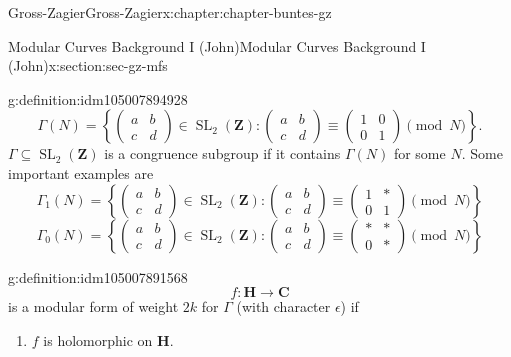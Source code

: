 \documentclass[oneside,10pt,]{book}
\numberwithin{equation}{section}
\newcommand{\ZZ}{\mathbf{Z}}
\newcommand{\CC}{\mathbf{C}}
\newcommand{\HH}{\mathbf{H}}
\DeclareMathOperator{\SL}{SL}
\newcommand{\amp}{&}
\begin{document}
\begin{chapterptx}{Gross-Zagier}{}{Gross-Zagier}{}{}{x:chapter:chapter-buntes-gz}
\begin{sectionptx}{Modular Curves Background I (John)}{}{Modular Curves Background I (John)}{}{}{x:section:sec-gz-mfs}
\begin{definition}{}{g:definition:idm105007894928}
\begin{equation*}
\Gamma (N) = \left\{\begin{pmatrix} a \amp b \\ c \amp d \end{pmatrix}\in \SL_2(\ZZ) : \begin{pmatrix} a \amp b \\ c \amp d \end{pmatrix} \equiv \begin{pmatrix} 1 \amp 0 \\ 0 \amp 1 \end{pmatrix} \pmod N\right\}\text{.}
\end{equation*}
\(\Gamma\subseteq \SL_2(\ZZ)\) is a  congruence subgroup if it contains \(\Gamma (N)\) for some \(N\). Some important examples are%
\begin{equation*}
\Gamma_1 (N) = \left\{\begin{pmatrix} a \amp b \\ c \amp d \end{pmatrix}\in \SL_2(\ZZ) : \begin{pmatrix} a \amp b \\ c \amp d \end{pmatrix} \equiv \begin{pmatrix} 1 \amp \ast \\ 0 \amp 1 \end{pmatrix} \pmod N\right\}
\end{equation*}
%
\begin{equation*}
\Gamma_0 (N) = \left\{\begin{pmatrix} a \amp b \\ c \amp d \end{pmatrix}\in \SL_2(\ZZ) : \begin{pmatrix} a \amp b \\ c \amp d \end{pmatrix} \equiv \begin{pmatrix} \ast \amp \ast \\ 0 \amp \ast \end{pmatrix} \pmod N\right\}
\end{equation*}
%
\end{definition}
\begin{definition}{}{g:definition:idm105007891568}%
%
\begin{equation*}
f\colon \HH \to \CC
\end{equation*}
is a modular form of weight \(2k\) for \(\Gamma \) (with character \(\epsilon \)) if%
\begin{enumerate}
\item{}\(f\) is holomorphic on \(\HH\).%

\end{enumerate}
\end{definition}
\end{sectionptx}
\end{chapterptx}
\end{document}
